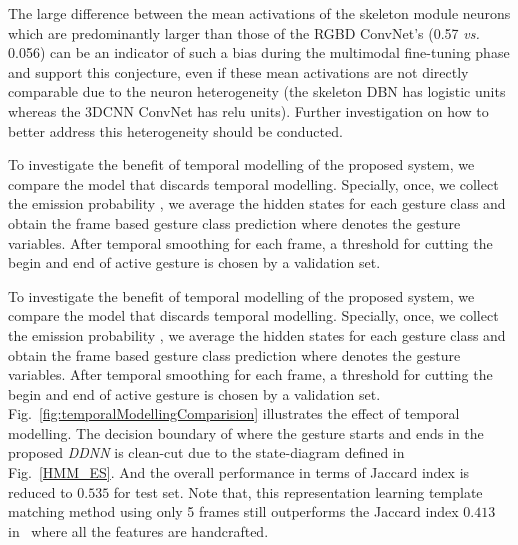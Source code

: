 %
The large difference between the mean activations of the  skeleton module neurons which are predominantly larger than those of the
RGBD ConvNet's (0.57 \emph{vs.} 0.056) can be an indicator of such a bias during the multimodal fine-tuning phase and
support this conjecture, even if these mean activations are not directly comparable
due to the neuron heterogeneity (the skeleton DBN has logistic units whereas the 3DCNN ConvNet has relu units).
%
Further investigation on how to better address this heterogeneity should be conducted.


%

%
 To investigate the benefit of temporal modelling of the proposed system, we compare the model that discards temporal modelling. Specially, once, we collect the emission probability \emissionprob{}, we average the hidden states for each gesture class and obtain the frame based gesture class prediction \gestureEmissionProb where \gesturehiddenstateFrame denotes the gesture variables. After temporal smoothing for each frame, a threshold for cutting the begin and end of active gesture is chosen by a validation set.



%

To investigate the benefit of temporal modelling of the proposed system, we compare the model that discards temporal modelling. Specially, once, we collect the emission probability \emissionprob{}, we average the hidden states for each gesture class and obtain the frame based gesture class prediction \gestureEmissionProb where \gesturehiddenstateFrame denotes the gesture variables. After temporal smoothing for each frame, a threshold for cutting the begin and end of active gesture is chosen by a validation set. Fig.~\ref{fig:temporalModellingComparision} illustrates the effect of temporal modelling. The decision boundary of where the gesture starts and ends in the proposed \emph{DDNN} is clean-cut due to the state-diagram defined in Fig.~\ref{HMM_ES}. And the overall performance in terms of  Jaccard index is reduced to $0.535$ for test set. Note that, this representation learning template matching method using only 5 frames still outperforms the Jaccard index $0.413$ in~\cite{camgoz2014gesture} where all the features are handcrafted.




